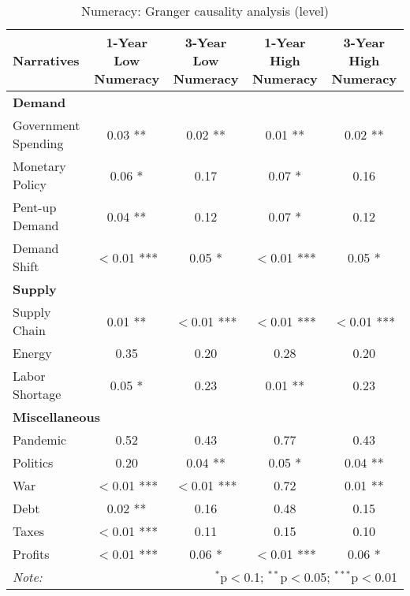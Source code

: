 \begin{sidewaystable}[ht]
\centering
\caption{Numeracy: Granger causality analysis (level)}\label{table:granger}

\begin{tabular}{lcccc}
\toprule
\textbf{Narratives} & \textbf{1-Year Low Numeracy} & \textbf{3-Year Low Numeracy} & \textbf{1-Year High Numeracy} & \textbf{3-Year High Numeracy} \\
\midrule
\multicolumn{5}{l}{\textbf{Demand}} \\
\midrule
Government Spending & 0.03 ** & 0.02 ** & 0.01 ** & 0.02 ** \\
Monetary Policy & 0.06 * & 0.17 & 0.07 * & 0.16 \\
Pent-up Demand & 0.04 ** & 0.12 & 0.07 * & 0.12 \\
Demand Shift & $<$0.01 *** & 0.05 * & $<$0.01 *** & 0.05 * \\
\midrule
\multicolumn{5}{l}{\textbf{Supply}} \\
\midrule
Supply Chain & 0.01 ** & $<$0.01 *** & $<$0.01 *** & $<$0.01 *** \\
Energy & 0.35 & 0.20 & 0.28 & 0.20 \\
Labor Shortage & 0.05 * & 0.23 & 0.01 ** & 0.23 \\
\midrule
\multicolumn{5}{l}{\textbf{Miscellaneous}} \\
\midrule
Pandemic & 0.52 & 0.43 & 0.77 & 0.43 \\
Politics & 0.20 & 0.04 ** & 0.05 * & 0.04 ** \\
War & $<$0.01 *** & $<$0.01 *** & 0.72 & 0.01 ** \\
Debt & 0.02 ** & 0.16 & 0.48 & 0.15 \\
Taxes & $<$0.01 *** & 0.11 & 0.15 & 0.10 \\
Profits & $<$0.01 *** & 0.06 * & $<$0.01 *** & 0.06 * \\
\midrule
\bottomrule
\textit{Note:}  & \multicolumn{4}{r}{$^{*}$p$<$0.1; $^{**}$p$<$0.05; $^{***}$p$<$0.01} \\
\bottomrule
\end{tabular}
\end{sidewaystable}
